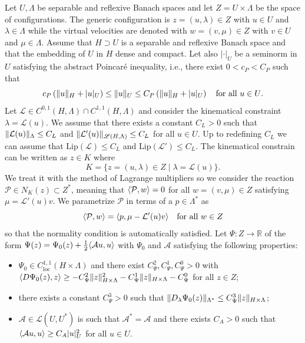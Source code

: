 \documentclass[a4paper,10pt,twoside]{amsbook}
\numberwithin{section}{chapter}
\numberwithin{equation}{chapter}
\theoremstyle{definition}
\DeclarePairedDelimiter{\norm}{\lVert}{\rVert}
\DeclarePairedDelimiter{\dual}{\langle}{\rangle}
\begin{document}
Let $U,\Lambda$ be separable and reflexive Banach spaces and let $Z=U\times\Lambda$ be the space of configurations. The generic configuration is $z=(u,\lambda)\in Z$ with $u\in U$ and $\lambda\in\Lambda$ while the virtual velocities are denoted with $w=(v,\mu)\in Z$ with $v\in U$ and $\mu\in\Lambda$. Assume that $H\supset U$ is a separable and reflexive Banach space and that the embedding of $U$ in $H$ dense and compact. Let also $|\cdot|_U$ be a seminorm in $U$ satisfying the abstract Poincaré inequality, i.e., there exist $0<c_P<C_P$ such that
\begin{equation}
\label{eqn:abstract-poincare}
c_P\left(\norm{u}_H+|u|_U\right)\le\norm{u}_U\le C_P\left(\norm{u}_H+|u|_U\right)\quad\text{for all $u\in U$.}
\end{equation}
Let $\mathcal{L}\in C^{0,1}(H,\Lambda)\cap C^{1,1}(H,\Lambda)$ and consider the kinematical constraint $\lambda=\mathcal{L}(u)$. We assume that there exists a constant $C_L>0$ such that $\norm{\mathcal{L}(u)}_\Lambda\le C_L$ and $\norm{\mathcal{L}'(u)}_{\mathscr{L}(H,\Lambda)}\le C_L$ for all $u\in U$. Up to redefining $C_L$ we can assume that $\text{Lip}(\mathcal{L})\le C_L$ and $\text{Lip}(\mathcal{L}')\le C_L$. The kinematical constrain can be written as $z\in K$ where
\[
K=\{z=(u,\lambda)\in Z\;|\;\lambda=\mathcal{L}(u)\}.
\]
We treat it with the method of Lagrange multipliers so we consider the reaction $\mathcal{P}\in N_K(z)\subset Z^*$, meaning that $\dual{\mathcal{P},w}=0$ for all $w=(v,\mu)\in Z$ satisfying $\mu=\mathcal{L}'(u)v$. We parametrize $\mathcal{P}$ in terms of a $p\in\Lambda^*$ as
\[
\dual{\mathcal{P},w}=\dual{p,\mu-\mathcal{L}'(u)v}\quad\text{for all $w\in Z$}
\]
so that the normality condition is automatically satisfied. Let $\Psi\colon Z\to\mathbb{R}$ of the form $\Psi(z)=\Psi_0(z)+\frac{1}{2}\dual{\mathcal{A}u,u}$ with $\Psi_0$ and $\mathcal{A}$ satisfying the following properties:
\begin{itemize}
\item[($\Psi$1)] $\Psi_0\in C^{1,1}_\text{loc}(H\times\Lambda)$ and there exist $C_\Psi^2,C^1_\Psi,C^0_\Psi>0$ with $\dual{D\Psi_0(z),z}\ge-C_\Psi^2\norm{z}_{H\times\Lambda}^2-C_\Psi^1\norm{z}_{H\times\Lambda}-C_\Psi^0$ for all $z\in Z$;
\item[($\Psi$2)] there exists a constant $C_\Psi^3>0$ such that $\norm{D_\lambda\Psi_0(z)}_{\Lambda^*}\le C_\Psi^3\norm{z}_{H\times\Lambda}$;
\item[(A)] $\mathcal{A}\in\mathscr{L}(U,U^*)$ is such that $\mathcal{A}^*=\mathcal{A}$ and there exists $C_A>0$ such that $\dual{\mathcal{A}u,u}\ge C_A|u|_U^2$ for all $u\in U$.
\end{itemize}
\end{document}

